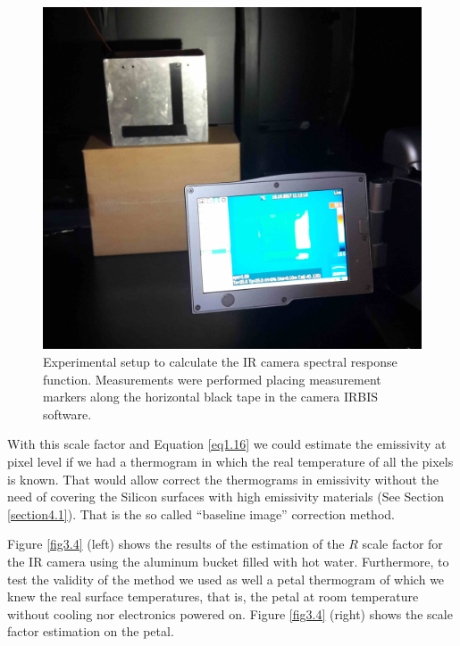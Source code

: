 		\begin{figure}[ht!]
			\centering
			\captionsetup{justification=centering,margin=2cm}
			\includegraphics[scale=0.1]{Figures/Chapter03/CameraAndBucket.jpg}
			\caption{Experimental setup to calculate the IR camera spectral response function. Measurements were performed placing measurement markers along the horizontal black tape in the camera IRBIS software.}\label{fig3.3}
		\end{figure}
		
		With this scale factor and Equation \ref{eq1.16} we could estimate the emissivity at pixel level if we had a thermogram in which the real temperature of all the pixels is known. That would allow correct the thermograms in emissivity without the need of covering the Silicon surfaces with high emissivity materials (See Section \ref{section4.1}). That is the so called “baseline image” correction method.
	
		Figure \ref{fig3.4} (left) shows the results of the estimation of the $R$ scale factor for the IR camera using the aluminum bucket filled with hot water. Furthermore, to test the validity of the method we used as well a petal thermogram of which we knew the real surface temperatures, that is, the petal at room temperature without cooling nor electronics powered on. Figure \ref{fig3.4} (right) shows the scale factor estimation on the petal.
		
